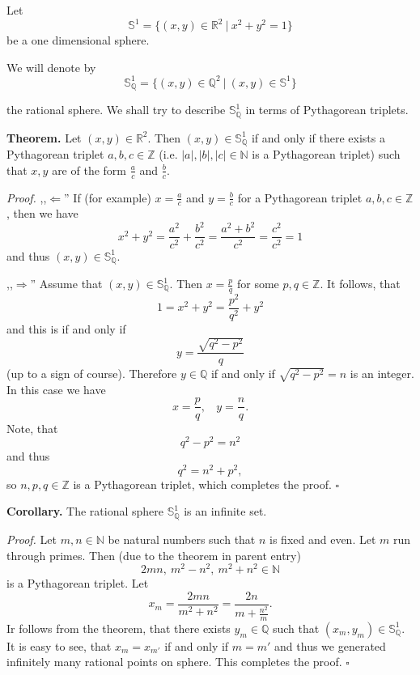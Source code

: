 \documentclass[12pt]{article}
\begin{document}
Let $$\mathbb{S}^{1}=\{(x,y)\in\mathbb{R}^2 \ |\ x^2+y^2=1\}$$ be a one dimensional sphere.

We will denote by $$\mathbb{S}^{1}_{\mathbb{Q}}=\{(x,y)\in\mathbb{Q}^2\ |\ (x,y)\in\mathbb{S}^1\}$$

the rational sphere. We shall try to describe $\mathbb{S}^1_{\mathbb{Q}}$ in terms of Pythagorean triplets.

\textbf{Theorem.} Let $(x,y)\in\mathbb{R}^2$. Then $(x,y)\in\mathbb{S}^1_{\mathbb{Q}}$ if and only if there exists a Pythagorean triplet $a,b,c\in\mathbb{Z}$ (i.e. $|a|,|b|,|c|\in\mathbb{N}$ is a Pythagorean triplet) such that $x,y$ are of the form $\frac{a}{c}$ and $\frac{b}{c}$.

\textit{Proof.} ,,$\Leftarrow$'' If (for example) $x=\frac{a}{c}$ and $y=\frac{b}{c}$ for a Pythagorean triplet $a,b,c\in\mathbb{Z}$, then we have
$$x^2+y^2=\frac{a^2}{c^2}+\frac{b^2}{c^2}=\frac{a^2+b^2}{c^2}=\frac{c^2}{c^2}=1$$
and thus $(x,y)\in\mathbb{S}^1_{\mathbb{Q}}$.

,,$\Rightarrow$'' Assume that $(x,y)\in\mathbb{S}^{1}_{\mathbb{Q}}$. Then $x=\frac{p}{q}$ for some $p,q\in\mathbb{Z}$. It follows, that
$$1=x^2+y^2=\frac{p^2}{q^2}+y^2$$
and this is if and only if 
$$y = \frac{\sqrt{q^2-p^2}}{q}$$
(up to a sign of course). Therefore $y\in\mathbb{Q}$ if and only if $\sqrt{q^2-p^2}=n$ is an integer. In this case we have
$$x=\frac{p}{q},\ \ \ \ y=\frac{n}{q}.$$
Note, that
$$q^2-p^2=n^2$$
and thus
$$q^2=n^2+p^2,$$
so $n,p,q\in\mathbb{Z}$ is a Pythagorean triplet, which completes the proof. $\square$

\textbf{Corollary.} The rational sphere $\mathbb{S}^1_{\mathbb{Q}}$ is an infinite set.

\textit{Proof.} Let $m,n\in\mathbb{N}$ be natural numbers such that $n$ is fixed and even. Let $m$ run through primes. Then (due to the theorem in parent entry)
$$2mn,\ m^2-n^2,\ m^2+n^2\in\mathbb{N}$$
is a Pythagorean triplet.
Let $$x_{m}=\frac{2mn}{m^2+n^2}=\frac{2n}{m+\frac{n^2}{m}}.$$
Ir follows from the theorem, that there exists $y_m\in\mathbb{Q}$ such that $(x_m,y_m)\in\mathbb{S}^1_{\mathbb{Q}}$. It is easy to see, that $x_m=x_{m'}$ if and only if $m=m'$ and thus we generated infinitely many rational points on sphere. This completes the proof. $\square$
\end{document}
